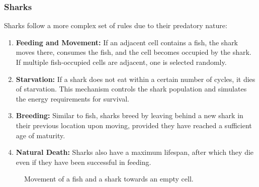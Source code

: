 \documentclass[conference,compsoc]{IEEEtran}
\begin{document}
\subsubsection{Sharks}
Sharks follow a more complex set of rules due to their predatory nature:
\begin{enumerate}
\item \textbf{Feeding and Movement:} If an adjacent cell contains a fish, the shark moves there, consumes the fish, and the cell becomes occupied by the shark. If multiple fish-occupied cells are adjacent, one is selected randomly.
\item \textbf{Starvation:} If a shark does not eat within a certain number of cycles, it dies of starvation. This mechanism controls the shark population and simulates the energy requirements for survival.
\item \textbf{Breeding:} Similar to fish, sharks breed by leaving behind a new shark in their previous location upon moving, provided they have reached a sufficient age of maturity.
\item \textbf{Natural Death:} Sharks also have a maximum lifespan, after which they die even if they have been successful in feeding.
\end{enumerate}

\begin{figure}[h]
\centering
{}
\caption{Movement of a fish and a shark towards an empty cell.}
\end{figure}
\end{document}
